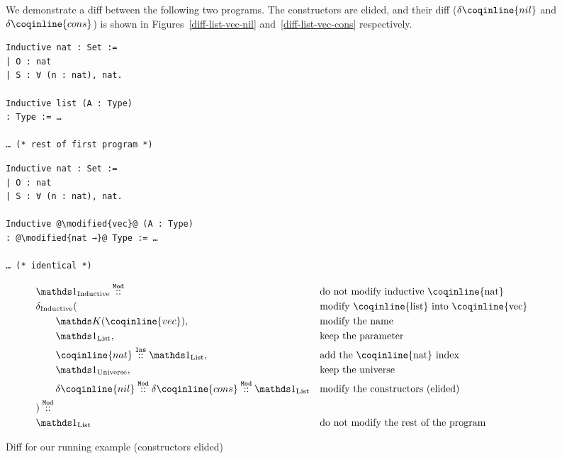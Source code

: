 \begin{figure*}[!htp]

  \centering

  We demonstrate a diff between the following two programs.  The constructors
are elided, and their diff ($\delta\coqinline{nil}$ and
$\delta\coqinline{cons}$) is shown in Figures~\ref{diff-list-vec-nil}
and~\ref{diff-list-vec-cons} respectively.

\noindent%
  \begin{minipage}[t]{0.50\textwidth}
    \begin{verbatim}
Inductive nat : Set :=
| O : nat
| S : ∀ (n : nat), nat.

Inductive list (A : Type)
: Type := …

… (* rest of first program *)
    \end{verbatim}
  \end{minipage}%
  \begin{minipage}[t]{0.50\textwidth}
    \begin{verbatim}
Inductive nat : Set :=
| O : nat
| S : ∀ (n : nat), nat.

Inductive @\modified{vec}@ (A : Type)
: @\modified{nat →}@ Type := …

… (* identical *)
    \end{verbatim}
  \end{minipage}

  \vspace{2em}%

  \begin{align*}
&\MathSameInductive{} \MathMod{}{} && \text{do not modify inductive \coqinline{nat}}\\
& \deltaInductive{} ( && \text{modify \coqinline{list} into \coqinline{vec}} \\
& \qquad \MathReplace{\coqinline{vec}}, && \text{modify the name} \\
& \qquad \MathSameList{},       && \text{keep the parameter} \\
& \qquad \MathIns{\coqinline{nat}}{\MathSameList{}}, && \text{add the \coqinline{nat} index} \\
& \qquad \MathSameUniverse{}, && \text{keep the universe} \\
& \qquad \MathMod{\delta\coqinline{nil}}{\MathMod{\delta\coqinline{cons}}{\MathSameList{}}}
  && \text{modify the constructors (elided)} \\
& ) \MathMod{}{} && \\
& \MathSameList{} && \text{do not modify the rest of the program}
  \end{align*}

  \caption{Diff for our running example (constructors elided)}
  \label{diff-list-vec}

\end{figure*}


